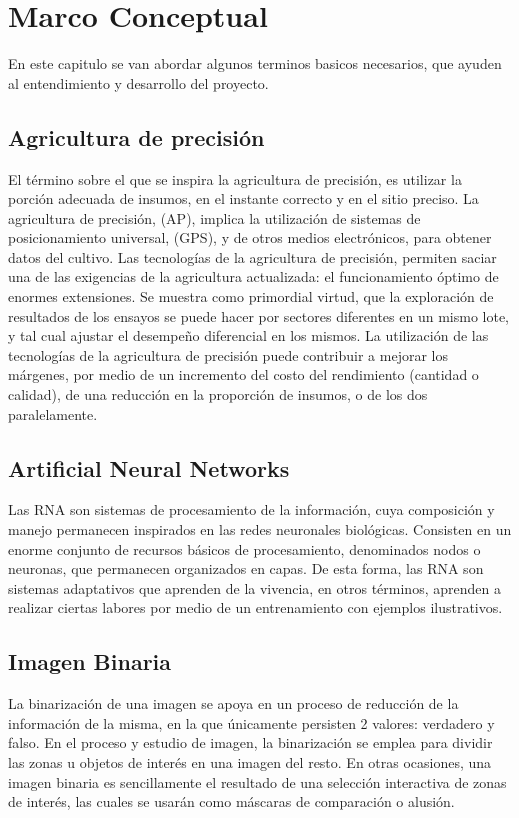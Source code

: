 \chapter{Marco Conceptual}
En este capitulo se van abordar algunos terminos basicos necesarios, que ayuden al entendimiento y desarrollo del proyecto. 
\section{Agricultura de precisión} El término sobre el que se inspira la agricultura de precisión, es utilizar la porción adecuada de insumos, en el instante correcto y en el sitio preciso. La agricultura de precisión, (AP), implica la utilización de sistemas de posicionamiento universal, (GPS), y de otros medios electrónicos, para obtener datos del cultivo. Las tecnologías de la agricultura de precisión, permiten saciar una de las exigencias de la agricultura actualizada: el funcionamiento óptimo de enormes extensiones. Se muestra como primordial virtud, que la exploración de resultados de los ensayos se puede hacer por sectores diferentes en un mismo lote, y tal cual ajustar el desempeño diferencial en los mismos. La utilización de las tecnologías de la agricultura de precisión puede contribuir a mejorar los márgenes, por medio de un incremento del costo del rendimiento (cantidad o calidad), de una reducción en la proporción de insumos, o de los dos paralelamente.
\\
\section{Artificial Neural Networks} Las RNA son sistemas de procesamiento de la información, cuya composición y manejo permanecen inspirados en las redes neuronales biológicas. Consisten en un enorme conjunto de recursos básicos de procesamiento, denominados nodos o neuronas, que permanecen organizados en capas. De esta forma, las RNA son sistemas adaptativos que aprenden de la vivencia, en otros términos, aprenden a realizar ciertas labores por medio de un entrenamiento con ejemplos ilustrativos.
\\ 

\section{Imagen Binaria} La binarización de una imagen se apoya en un proceso de reducción de la información de la misma, en la que únicamente persisten 2 valores: verdadero y falso. En el proceso y estudio de imagen, la binarización se emplea para dividir las zonas u objetos de interés en una imagen del resto. En otras ocasiones, una imagen binaria es sencillamente el resultado de una selección interactiva de zonas de interés, las cuales se usarán como máscaras de comparación o alusión.
\\ 

